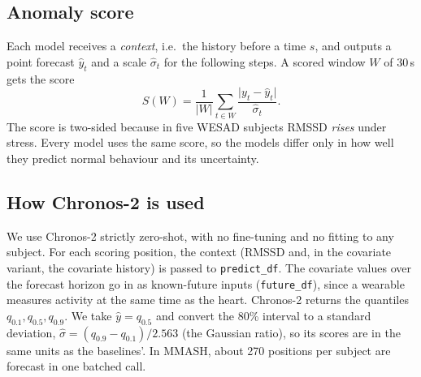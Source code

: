 \documentclass[11pt,a4paper]{article}
\begin{document}
\subsection{Anomaly score}
Each model receives a \emph{context}, i.e.\ the history before a time $s$, and outputs a point forecast $\hat y_t$ and a scale $\hat\sigma_t$ for the following steps. A scored window $W$ of 30\,s gets the score
\begin{equation}
  S(W) = \frac{1}{|W|}\sum_{t\in W}\frac{\lvert y_t-\hat y_t\rvert}{\hat\sigma_t}.
  \label{eq:score}
\end{equation}
The score is two-sided because in five WESAD subjects RMSSD \emph{rises} under stress. Every model uses the same score, so the models differ only in how well they predict normal behaviour and its uncertainty.

\subsection{How Chronos-2 is used}
We use Chronos-2 strictly zero-shot, with no fine-tuning and no fitting to any subject. For each scoring position, the context (RMSSD and, in the covariate variant, the covariate history) is passed to \texttt{predict\_df}. The covariate values over the forecast horizon go in as known-future inputs (\texttt{future\_df}), since a wearable measures activity at the same time as the heart. Chronos-2 returns the quantiles $q_{0.1}, q_{0.5}, q_{0.9}$. We take $\hat y=q_{0.5}$ and convert the 80\% interval to a standard deviation, $\hat\sigma=(q_{0.9}-q_{0.1})/2.563$ (the Gaussian ratio), so its scores are in the same units as the baselines'. In MMASH, about 270 positions per subject are forecast in one batched call.
\end{document}

